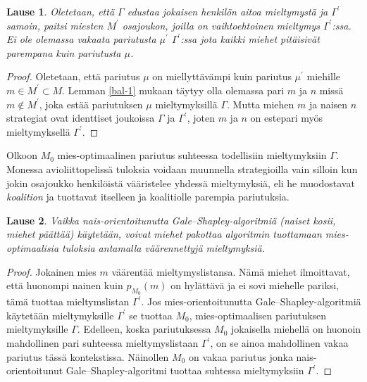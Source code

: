 \documentclass[finnish]{tktltiki2}
\newtheorem{lau}{Lause}
\theoremstyle{definition}
\theoremstyle{remark}
\begin{document}
\begin{lau}\cite[p, 593]{Balinski}
	Oletetaan, että $\Gamma$ edustaa jokaisen henkilön aitoa mieltymystä ja $\Gamma^{'}$ samoin, paitsi miesten $M^{'}$ osajoukon, joilla on vaihtoehtoinen mieltymys $\Gamma^{'}$:ssa. Ei ole olemassa vakaata pariutusta $\mu^{'}$ $\Gamma^{'}$:ssa jota kaikki miehet pitäisivät parempana kuin pariutusta $\mu$.
\end{lau}
\begin{proof}
	Oletetaan, että pariutus $\mu$ on miellyttävämpi kuin pariutus $\mu^{'}$ miehille $m \in M^{'} \subset M$. Lemman \ref{bal-1} mukaan täytyy olla olemassa pari $m$ ja $n$ missä $m \notin M^{'}$, joka estää pariutuksen $\mu$ mieltymyksillä $\Gamma$. Mutta miehen $m$ ja naisen $n$ strategiat ovat identtiset joukoissa $\Gamma$ ja $\Gamma^{'}$, joten $m$ ja $n$ on estepari myös mieltymyksellä $\Gamma^{'}$.
\end{proof}

Olkoon $M_0$ mies-optimaalinen pariutus suhteessa todellisiin mieltymyksiin $\Gamma$. Monessa avioliittopelissä tuloksia voidaan muunnella strategioilla vain silloin kun jokin osajoukko henkilöistä vääristelee yhdessä mieltymyksiä, eli he muodostavat \emph{koalition} ja tuottavat itselleen ja koalitiolle parempia pariutuksia.

\begin{lau}\cite[p, 58]{gusfield1989stable}
	Vaikka nais-orientoitunutta Gale--Shapley-algoritmiä (naiset kosii, miehet päättää) käytetään, voivat miehet pakottaa algoritmin tuottamaan mies-optimaalisia tuloksia antamalla väärennettyjä mieltymyksiä.
\end{lau}

\begin{proof}
	Jokainen mies $m$ väärentää mieltymyslistansa. Nämä miehet ilmoittavat, että huonompi nainen kuin $p_{M_0}(m)$ on hylättävä ja ei sovi miehelle pariksi, tämä tuottaa mieltymslistan $\Gamma^{'}$. Jos mies-orientoitunutta Gale--Shapley-algoritmiä käytetään mieltymyksille $\Gamma^{'}$ se tuottaa $M_0$, mies-optimaalisen pariutuksen mieltymyksille $\Gamma$. Edelleen, koska pariutuksessa $M_0$ jokaisella miehellä on huonoin mahdollinen pari suhteessa mieltymyslistaan $\Gamma^{'}$, on se ainoa mahdollinen vakaa pariutus tässä kontekstissa. Näinollen $M_0$ on vakaa pariutus jonka nais-orientoitunut Gale--Shapley-algoritmi tuottaa suhtessa mieltymyksiin $\Gamma^{'}$.
\end{proof}
\end{document}
